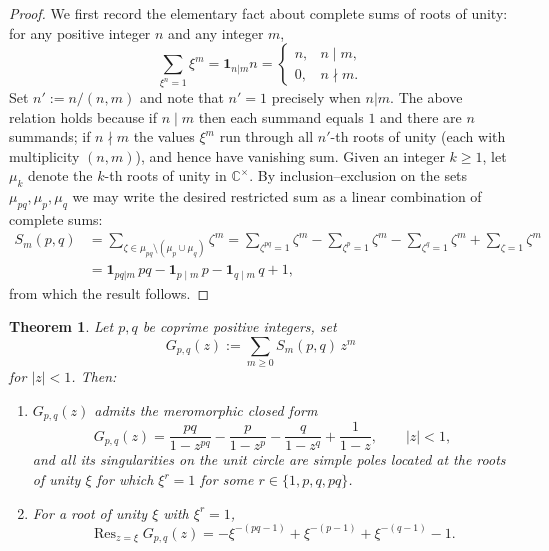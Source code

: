 \documentclass[table]{amsart}
\newtheorem{theorem}{Theorem}[section]
\numberwithin{equation}{section}
\begin{document}
\begin{proof}
We first record the elementary fact about complete sums of roots of unity: for any positive integer \(n\) and any integer \(m\),
\[
\sum_{\xi^{n}=1}\xi^{m}= \mathbf{1}_{n|m} n=
\begin{cases}
n,& n\mid m,\\[4pt]
0,& n\nmid m.
\end{cases}
\]
Set $n':=n/(n,m)$ and note that $n'=1$ precisely when $n|m$. The above relation holds because if \(n\mid m\) then each summand equals \(1\) and there are \(n\) summands; if \(n\nmid m\) the values \(\xi^m\) run through all \(n'\)-th roots of unity (each with multiplicity $(n, m)$), and hence have vanishing sum. Given an integer $k\geq 1$, let $\mu_k$ denote the $k$-th roots of unity in $\mathbb{C}^\times$. By inclusion–exclusion on the sets \(\mu_{pq},\mu_p,\mu_q\) we may write the desired restricted sum as a linear combination of complete sums:
\[
\begin{aligned}
S_m(p,q)
&=\sum_{\zeta\in\mu_{pq}\setminus(\mu_p\cup\mu_q)}\zeta^m
=\sum_{\zeta^{pq}=1}\zeta^m-\sum_{\zeta^p=1}\zeta^m-\sum_{\zeta^q=1}\zeta^m+\sum_{\zeta=1}\zeta^m\\[4pt]
&=\mathbf{1}_{pq|m}\,pq-\mathbf{1}_{p\mid m}\,p-\mathbf{1}_{q\mid m}\,q+1,
\end{aligned}
\]from which the result follows.
\end{proof}


\begin{theorem}\label{Theorem G p q residues}
Let \(p,q\) be coprime positive integers, set 
\[G_{p,q}(z):=\sum_{m\ge0} S_m(p,q)\,z^m
\]
\noindent for $|z|<1$. Then:
\begin{enumerate}
  \item \(G_{p,q}(z)\) admits the meromorphic closed form
  \[
  G_{p,q}(z)=\frac{pq}{1-z^{pq}}-\frac{p}{1-z^p}-\frac{q}{1-z^q}+\frac{1}{1-z},
  \qquad |z|<1,
  \]
  and all its singularities on the unit circle are simple poles located at the roots of unity \(\xi\) for which \(\xi^r=1\) for some \(r\in\{1,p,q,pq\}\).
  \item For a root of unity \(\xi\) with \(\xi^r=1\),
  \[
  \operatorname{Res}_{z=\xi}G_{p,q}(z)
  = -\xi^{-(pq-1)}+\xi^{-(p-1)}+\xi^{-(q-1)}-1.
  \]
\end{enumerate}
\end{theorem}
\end{document}
